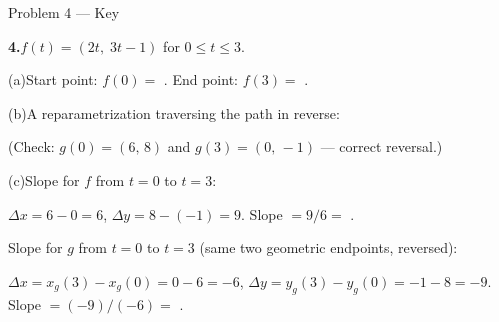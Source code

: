 \documentclass[10pt]{article}
\begin{document}
\begin{notesbox}{Problem 4 --- Key}

\textbf{4.}\quad $f(t) = (2t,\; 3t - 1)$ for $0 \le t \le 3$.

\vspace{4pt}
(a)\quad Start point: $f(0) = $ . End point: $f(3) = $ .

\vspace{6pt}
(b)\quad A reparametrization traversing the path in reverse:


(Check: $g(0) = (6,\,8)$ and $g(3) = (0,\,-1)$ --- correct reversal.)

\vspace{6pt}
(c)\quad Slope for $f$ from $t = 0$ to $t = 3$:

$\Delta x = 6 - 0 = 6$, $\Delta y = 8 - (-1) = 9$.
Slope $= 9/6 = $ .

Slope for $g$ from $t = 0$ to $t = 3$ (same two geometric endpoints, reversed):

$\Delta x = x_g(3) - x_g(0) = 0 - 6 = -6$,
$\Delta y = y_g(3) - y_g(0) = -1 - 8 = -9$.
Slope $= (-9)/(-6) = $ .


\end{notesbox}

\vspace{0.08in}
\end{document}
